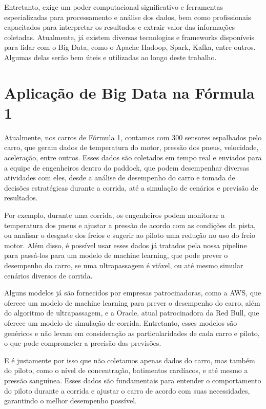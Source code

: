\documentclass[12pt, %
openright, 
oneside, %
a4paper,    %
brazil]{facom-ufu-abntex2}
\begin{document}
Entretanto, exige um poder computacional significativo e ferramentas especializadas para processamento e análise dos dados,
bem como profissionais capacitados para interpretar os resultados e extrair valor das informações coletadas. Atualmente,
já existem diversas tecnologias e frameworks disponíveis para lidar com o Big Data, como o Apache Hadoop, Spark, Kafka, entre outros.
Algumas delas serão bem úteis e utilizadas ao longo deste trabalho.

\section{Aplicação de Big Data na Fórmula 1}
Atualmente, nos carros de Fórmula 1, contamos com 300 sensores espalhados pelo carro, que geram dados de temperatura do motor, pressão 
dos pneus, velocidade, aceleração, entre outros. Esses dados são coletados em tempo real e enviados para a equipe de engenheiros dentro do paddock,
que podem desempenhar diversas atividades com eles, desde a análise de desempenho do carro e tomada de decisões estratégicas durante a 
corrida, até a simulação de cenários e previsão de resultados.

Por exemplo, durante uma corrida, os engenheiros podem monitorar a temperatura dos pneus e ajustar a pressão de acordo com as 
condições da pista, ou analisar o desgaste dos freios e sugerir ao piloto uma redução no uso do freio motor. Além disso, é possível
usar esses dados já tratados pela nossa pipeline para passá-los para um modelo de machine learning, que pode prever o desempenho do carro,
se uma ultrapassagem é viável, ou até mesmo simular cenários diversos de corrida.

Alguns modelos já são fornecidos por empresas patrocinadoras, como a AWS, que oferece um modelo de machine learning para prever o 
desempenho do carro, além do algoritmo de ultrapassagem, e a Oracle, atual patrocinadora da Red Bull, que oferece um modelo de simulação
de corrida. Entretanto, esses modelos são genéricos e não levam em consideração as particularidades de cada carro e piloto, o que pode
comprometer a precisão das previsões.

E é justamente por isso que não coletamos apenas dados do carro, mas também do piloto, como o nível de concentração, batimentos cardíacos,
e até mesmo a pressão sanguínea. Esses dados são fundamentais para entender o comportamento do piloto durante a corrida e ajustar o carro
de acordo com suas necessidades, garantindo o melhor desempenho possível.
\end{document}
